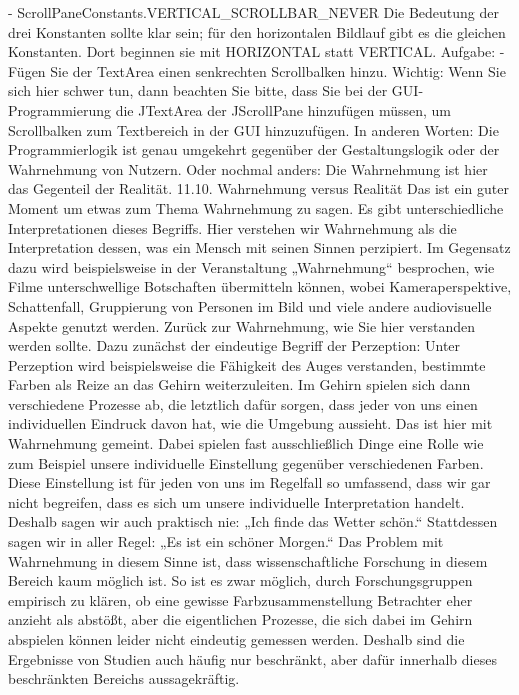 -	ScrollPaneConstants.VERTICAL_SCROLLBAR_NEVER
Die Bedeutung der drei Konstanten sollte klar sein; für den horizontalen Bildlauf gibt es die gleichen Konstanten. Dort beginnen sie mit HORIZONTAL statt VERTICAL.
Aufgabe:
-	Fügen Sie der TextArea einen senkrechten Scrollbalken hinzu.
Wichtig: Wenn Sie sich hier schwer tun, dann beachten Sie bitte, dass Sie bei der GUI-Programmierung die JTextArea der JScrollPane hinzufügen müssen, um Scrollbalken zum Textbereich in der GUI hinzuzufügen. In anderen Worten: Die Programmierlogik ist genau umgekehrt gegenüber der Gestaltungslogik oder der Wahrnehmung von Nutzern. Oder nochmal anders: Die Wahrnehmung ist hier das Gegenteil der Realität.
11.10.	Wahrnehmung versus Realität
Das ist ein guter Moment um etwas zum Thema Wahrnehmung zu sagen. Es gibt unterschiedliche Interpretationen dieses Begriffs. Hier verstehen wir Wahrnehmung als die Interpretation dessen, was ein Mensch mit seinen Sinnen perzipiert. Im Gegensatz dazu wird beispielsweise in der Veranstaltung „Wahrnehmung“ besprochen, wie Filme unterschwellige Botschaften übermitteln können, wobei Kameraperspektive, Schattenfall, Gruppierung von Personen im Bild und viele andere audiovisuelle Aspekte genutzt werden.
Zurück zur Wahrnehmung, wie Sie hier verstanden werden sollte. Dazu zunächst der eindeutige Begriff der Perzeption: Unter Perzeption wird beispielsweise die Fähigkeit des Auges verstanden, bestimmte Farben als Reize an das Gehirn weiterzuleiten. Im Gehirn spielen sich dann verschiedene Prozesse ab, die letztlich dafür sorgen, dass jeder von uns einen individuellen Eindruck davon hat, wie die Umgebung aussieht. Das ist hier mit Wahrnehmung gemeint. Dabei spielen fast ausschließlich Dinge eine Rolle wie zum Beispiel unsere individuelle Einstellung gegenüber verschiedenen Farben. Diese Einstellung ist für jeden von uns im Regelfall so umfassend, dass wir gar nicht begreifen, dass es sich um unsere individuelle Interpretation handelt. Deshalb sagen wir auch praktisch nie: „Ich finde das Wetter schön.“ Stattdessen sagen wir in aller Regel: „Es ist ein schöner Morgen.“
Das Problem mit Wahrnehmung in diesem Sinne ist, dass wissenschaftliche Forschung in diesem Bereich kaum möglich ist. So ist es zwar möglich, durch Forschungsgruppen empirisch zu klären, ob eine gewisse Farbzusammenstellung Betrachter eher anzieht als abstößt, aber die eigentlichen Prozesse, die sich dabei im Gehirn abspielen können leider nicht eindeutig gemessen werden. Deshalb sind die Ergebnisse von Studien auch häufig nur beschränkt, aber dafür innerhalb dieses beschränkten Bereichs aussagekräftig. 
